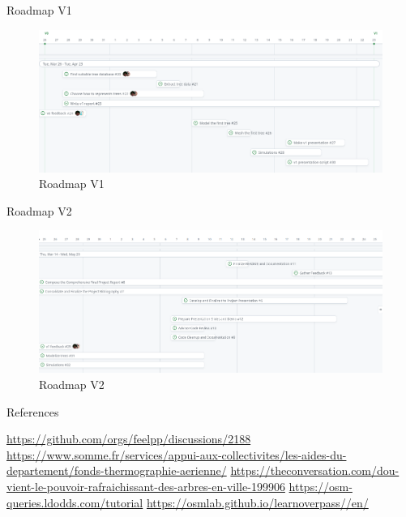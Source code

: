 \documentclass[10pt]{beamer}
\begin{document}
\begin{frame}{Roadmap V1}
  \begin{figure}[h] %
    \centering
    \includegraphics[width=1\textwidth]{images/roadmap_v1.png}
    \caption{Roadmap V1} %
    \label{fig:roadmap_v1} %
    \end{figure}
\end{frame}

\begin{frame}{Roadmap V2}
  \begin{figure}[h] %
    \centering
    \includegraphics[width=1\textwidth]{images/roadmap_v2.png}
    \caption{Roadmap V2} %
    \label{fig:roadmap_v2} %
    \end{figure}
\end{frame}



\begin{frame}{References}
\begin{thebibliography}{9}
   \url{https://github.com/orgs/feelpp/discussions/2188}
   \url{https://www.somme.fr/services/appui-aux-collectivites/les-aides-du-departement/fonds-thermographie-aerienne/}
   \url{https://theconversation.com/dou-vient-le-pouvoir-rafraichissant-des-arbres-en-ville-199906}
   \url{https://osm-queries.ldodds.com/tutorial}
   \url{https://osmlab.github.io/learnoverpass//en/}
\end{thebibliography}
\end{frame}
\end{document}
